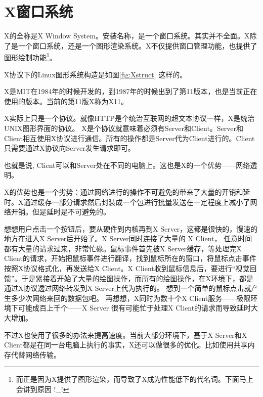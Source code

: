 \documentclass[amstex,twoside]{ctexbook}
\newenvironment{notice}{\tt}{}
\begin{document}
\section{X窗口系统}

X的全称是X Window System。安装名称，是一个窗口系统。其实并不全面。X除了是一个窗口系统，还是一个图形渲染系统。X不仅提供窗口管理功能，也提供了图形绘制功能\footnote{而正是因为X提供了图形渲染，而导致了X成为性能低下的代名词。下面马上会讲到原因 !\_!}。

X协议下的Linux图形系统构造是如图\ref{fig:Xstruct} 这样的。

X是MIT在1984年的时候开发的，到1987年的时候出到了第11版本，也是当前正在使用的版本。当前的第11版X称为X11。

X实际上只是一个协议。就像HTTP是个统治互联网的超文本协议一样，X是统治UNIX图形界面的协议。
X是个协议就意味着必须有Server和Client。Server和Client相互使用X协议进行通信。所有的操作都是Server代为Client进行的。Client只需要通过X协议向Server发生请求即可。

也就是说, Client可以和Server处在不同的电脑上。这也是X的一个优势——网络透明。


X的优势也是一个劣势：通过网络进行的操作不可避免的带来了大量的开销和延时。X通过缓存一部分请求然后封装成一个包进行批量发送在一定程度上减小了网络开销。但是延时是不可避免的。

\begin{notice}

想想用户点击一个按钮后，要从硬件到内核再到X Server，这都是很快的，慢速的地方在进入X Server后开始了。X Server同时连接了大量的 X Client， 任意时间都有大量的请求过来，非常忙碌。鼠标事件首先被X Server缓存，等处理完X Client的请求，开始把鼠标事件进行翻译，找到鼠标所在的窗口，将鼠标点击事件按照X协议格式化，再发送给X Client。X Client收到鼠标信息后，要进行“视觉回馈”。于是紧接着开始了大量的绘图操作，而所有的绘图操作，在X环境下，都是通过X协议透过网络转发到X Server上代为执行的。
想到一个简单的鼠标点击就产生多少次网络来回的数据包吧。 再想想，X同时为数十个X Client服务——极限环境下可能成百上千个——X Server 很有可能忙于处理X Client的请求而导致延时大大增加。



\end{notice}


不过X也使用了很多的办法来提高速度。当前大部分环境下，基于X Server和X Client都是在同一台电脑上执行的事实，X还可以做很多的优化。比如使用共享内存代替网络传输。
\end{document}
